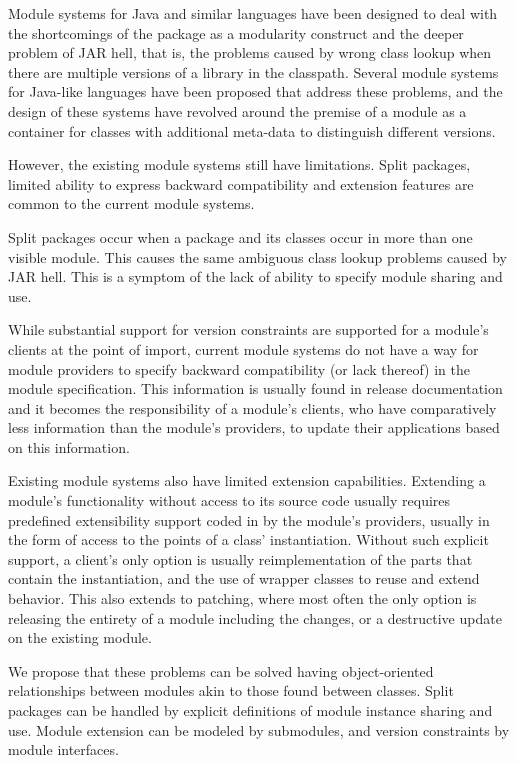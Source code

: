 Module systems for Java and similar languages have been designed 
to deal with the shortcomings of the package as a modularity construct
and the deeper problem of JAR hell, that is, the problems caused
by wrong class lookup when there are multiple versions of a library
in the classpath. Several module systems for Java-like languages 
have been proposed \cite{javajars, OSGi4, netassemblies, JSR294, JSR277}
that address these problems, and the design of these systems have
revolved around the premise of a module as a container for classes
with additional meta-data to distinguish different versions.

However, the existing module systems still have limitations. Split packages, 
limited ability to express backward compatibility and extension
features are common to the current module systems.

Split packages \cite{iJAMComments} occur when 
a package and its classes occur in more than one visible module. This
causes the same ambiguous class lookup problems caused by JAR hell.
This is a symptom of the lack of ability to specify module sharing
and use.

While substantial support for version constraints are supported
for a module's clients at the point of import, current module 
systems do not have a way for module providers to specify backward 
compatibility (or lack thereof) in the module specification. 
This information is usually found in release documentation and 
it becomes the responsibility of a module's clients, who have comparatively
less information than the module's providers, to update 
their applications based on this information. 

Existing module systems also have limited extension capabilities. Extending
a module's functionality without access to its source code usually 
requires predefined extensibility support coded in by the module's 
providers, usually in the form of access to the points of a class' 
instantiation. Without such explicit support, a client's only option
is usually reimplementation of the parts that contain the instantiation, 
and the use of wrapper classes to reuse and extend behavior. This also
extends to patching, where most often the only option is releasing the 
entirety of a module including the changes, or a destructive update
on the existing module.

We propose that these problems can be solved having object-oriented relationships
between modules akin to those found between classes. Split packages can 
be handled by explicit definitions of module instance sharing and use.
Module extension can be modeled by submodules, and version constraints
by module interfaces. 


